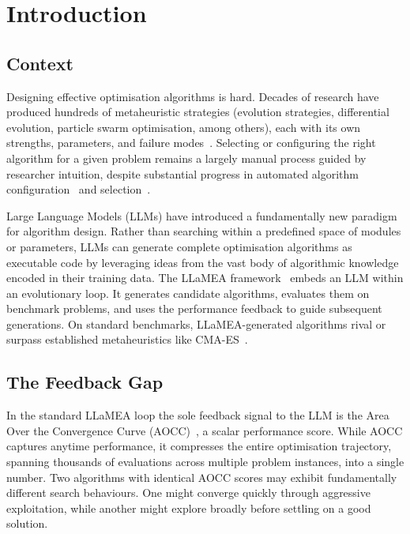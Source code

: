 
\chapter{Introduction}
\label{ch:introduction}

\section{Context}
\label{sec:intro-context}

Designing effective optimisation algorithms is hard. Decades of research have produced hundreds of metaheuristic strategies (evolution strategies, differential evolution, particle swarm optimisation, among others), each with its own strengths, parameters, and failure modes~\cite{eiben2015introduction}. Selecting or configuring the right algorithm for a given problem remains a largely manual process guided by researcher intuition, despite substantial progress in automated algorithm configuration~\cite{hutter2009paramils} and selection~\cite{rice1976algorithmselection}.

Large Language Models (LLMs) have introduced a fundamentally new paradigm for algorithm design. Rather than searching within a predefined space of modules or parameters, LLMs can generate complete optimisation algorithms as executable code by leveraging ideas from the vast body of algorithmic knowledge encoded in their training data. The LLaMEA framework~\cite{vanStein2024LLaMEA} embeds an LLM within an evolutionary loop. It generates candidate algorithms, evaluates them on benchmark problems, and uses the performance feedback to guide subsequent generations. On standard benchmarks, LLaMEA-generated algorithms rival or surpass established metaheuristics like CMA-ES~\cite{hansen2001cmaes}.

\section{The Feedback Gap}
\label{sec:intro-gap}

In the standard LLaMEA loop the sole feedback signal to the LLM is the Area Over the Convergence Curve (AOCC)~\cite{vanStein2025BLADE}, a scalar performance score. While AOCC captures anytime performance, it compresses the entire optimisation trajectory, spanning thousands of evaluations across multiple problem instances, into a single number. Two algorithms with identical AOCC scores may exhibit fundamentally different search behaviours. One might converge quickly through aggressive exploitation, while another might explore broadly before settling on a good solution.

